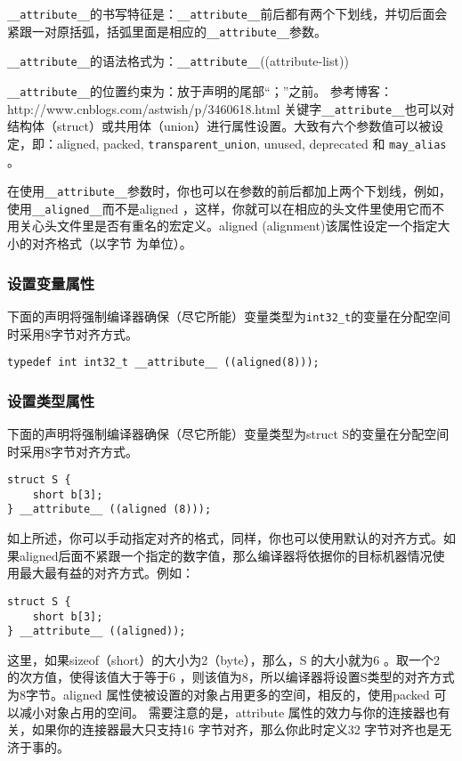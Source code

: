 			\texttt{__attribute__}的书写特征是：\texttt{__attribute__}前后都有两个下划线，并切后面会紧跟一对原括弧，括弧里面是相应的\texttt{__attribute__}参数。

			\texttt{__attribute__}的语法格式为：\texttt{__attribute__}((attribute-list))

			\texttt{__attribute__}的位置约束为：放于声明的尾部“；”之前。
			参考博客：http://www.cnblogs.com/astwish/p/3460618.html
			关键字\texttt{__attribute__}也可以对结构体（struct）或共用体（union）进行属性设置。大致有六个参数值可以被设定，即：aligned, packed, \texttt{transparent_union}, unused, deprecated 和 \texttt{may_alias} 。

			在使用\texttt{__attribute__}参数时，你也可以在参数的前后都加上两个下划线，例如，使用\texttt{__aligned__}而不是aligned ，这样，你就可以在相应的头文件里使用它而不用关心头文件里是否有重名的宏定义。aligned (alignment)该属性设定一个指定大小的对齐格式（以字节 为单位）。		

			\subsubsection{设置变量属性}
				下面的声明将强制编译器确保（尽它所能）变量类型为\texttt{int32_t}的变量在分配空间时采用8字节对齐方式。

\begin{verbatim}
typedef int int32_t __attribute__ ((aligned(8)));
\end{verbatim}
			\subsubsection{设置类型属性}

				下面的声明将强制编译器确保（尽它所能）变量类型为struct S的变量在分配空间时采用8字节对齐方式。				
\begin{verbatim}
struct S {
	short b[3];
} __attribute__ ((aligned (8)));
\end{verbatim}

			如上所述，你可以手动指定对齐的格式，同样，你也可以使用默认的对齐方式。如果aligned后面不紧跟一个指定的数字值，那么编译器将依据你的目标机器情况使用最大最有益的对齐方式。例如：

\begin{verbatim}
struct S {
	short b[3];
} __attribute__ ((aligned));
\end{verbatim}

			这里，如果sizeof（short）的大小为2（byte），那么，S 的大小就为6 。取一个2 的次方值，使得该值大于等于6 ，则该值为8，所以编译器将设置S类型的对齐方式为8字节。aligned 属性使被设置的对象占用更多的空间，相反的，使用packed 可以减小对象占用的空间。
			需要注意的是，attribute 属性的效力与你的连接器也有关，如果你的连接器最大只支持16 字节对齐，那么你此时定义32 字节对齐也是无济于事的。


